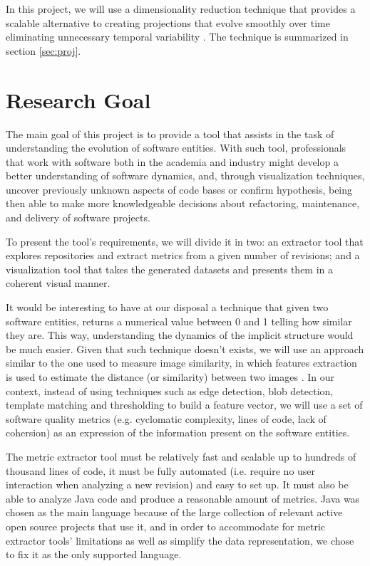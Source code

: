 In this project, we will use a dimensionality reduction technique that provides a scalable alternative to creating projections that evolve smoothly over time eliminating unnecessary temporal variability \cite{ref:dtsne}. The technique is summarized in section \ref{sec:proj}.

\section{Research Goal} \label{research_goal}
The main goal of this project is to provide a tool that assists in the task of understanding the evolution of software entities. With such tool, professionals that work with software both in the academia and industry might develop a better understanding of software dynamics, and, through visualization techniques, uncover previously unknown aspects of code bases or confirm hypothesis, being then able to make more knowledgeable decisions about refactoring, maintenance, and delivery of software projects.

To present the tool's requirements, we will divide it in two: an extractor tool that explores repositories and extract metrics from a given number of revisions; and a visualization tool that takes the generated datasets and presents them in a coherent visual manner.

It would be interesting to have at our disposal a technique that given two software entities, returns a numerical value between 0 and 1 telling how similar they are. This way, understanding the dynamics of the implicit structure would be much easier. Given that such technique doesn't exists, we will use an approach similar to the one used to measure image similarity, in which features extraction is used to estimate the distance (or similarity) between two images  \cite{ref:imagefeatures}. In our context, instead of using techniques such as edge detection, blob detection, template matching and thresholding to build a feature vector, we will use a set of software quality metrics (e.g. cyclomatic complexity, lines of code, lack of cohersion) as an expression of the information present on the software entities.

The metric extractor tool must be relatively fast and scalable up to hundreds of thousand lines of code, it must be fully automated (i.e. require no user interaction when analyzing a new revision) and easy to set up. It must also be able to analyze Java code and produce a reasonable amount of metrics. Java was chosen as the main language because of the large collection of relevant active open source projects that use it, and in order to accommodate for metric extractor tools' limitations as well as simplify the data representation, we chose to fix it as the only supported language.


